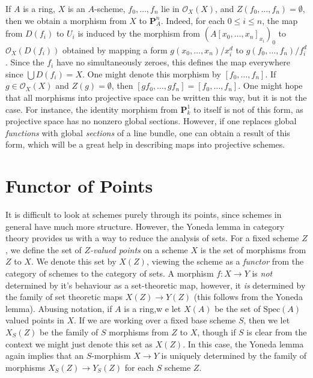 If $A$ is a ring, $X$ is an $A$-scheme, $f_0,\dots,f_n$ lie in $\mathcal{O}_X(X)$, and $Z(f_0,\dots,f_n) = \emptyset$, then we obtain a morphism from $X$ to $\mathbf{P}^n_A$. Indeed, for each $0 \leq i \leq n$, the map from $D(f_i)$ to $U_i$ is induced by the morphism from $(A[x_0,\dots,x_n]_{x_i})_0$ to $\mathcal{O}_X(D(f_i))$ obtained by mapping a form $g(x_0,\dots,x_n)/x_i^d$ to $g(f_0,\dots,f_n)/f_i^d$. Since the $f_i$ have no simultaneously zeroes, this defines the map everywhere since $\bigcup D(f_i) = X$. One might denote this morphism by $[f_0,\dots,f_n]$. If $g \in \mathcal{O}_X(X)$ and $Z(g) = \emptyset$, then $[gf_0,\dots,gf_n] = [f_0,\dots,f_n]$. One might hope that all morphisms into projective space can be written this way, but it is not the case. For instance, the identity morphism from $\mathbf{P}^1_k$ to itself is not of this form, as projective space has no nonzero global sections. However, if one replaces global \emph{functions} with global \emph{sections} of a line bundle, one can obtain a result of this form, which will be a great help in describing maps into projective schemes.













\section{Functor of Points}

It is difficult to look at schemes purely through its points, since schemes in general have much more structure. However, the Yoneda lemma in category theory provides us with a way to reduce the analysis of sets. For a fixed scheme $Z$, we define the set of \emph{$Z$-valued points} on a scheme $X$ is the set of morphisms from $Z$ to $X$. We denote this set by $X(Z)$, viewing the scheme as a \emph{functor} from the category of schemes to the category of sets. A morphism $f: X \to Y$ is \emph{not} determined by it's behaviour as a set-theoretic map, however, it \emph{is} determined by the family of set theoretic maps $X(Z) \to Y(Z)$ (this follows from the Yoneda lemma). Abusing notation, if $A$ is a ring,w e let $X(A)$ be the set of $\text{Spec}(A)$ valued points in $X$. If we are working over a fixed base scheme $S$, then we let $X_S(Z)$ be the family of $S$ morphisms from $Z$ to $X$, though if $S$ is clear from the context we might just denote this set as $X(Z)$. In this case, the Yoneda lemma again implies that an $S$-morphism $X \to Y$ is uniquely determined by the family of morphisms $X_S(Z) \to Y_S(Z)$ for each $S$ scheme $Z$.

